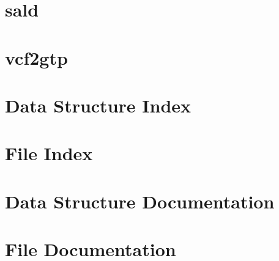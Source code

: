 \documentclass[twoside]{article}
\newcommand{\+}{\discretionary{\mbox{\scriptsize$\hookleftarrow$}}{}{}}
\begin{document}
\section{sald}
\label{sald}
\hypertarget{sald}{}

\section{vcf2gtp}
\label{vcf2gtp}
\hypertarget{vcf2gtp}{}

\section{Data Structure Index}

\section{File Index}

\section{Data Structure Documentation}

































\section{File Documentation}





















































\newpage
{}
{}
\printindex
\end{document}
